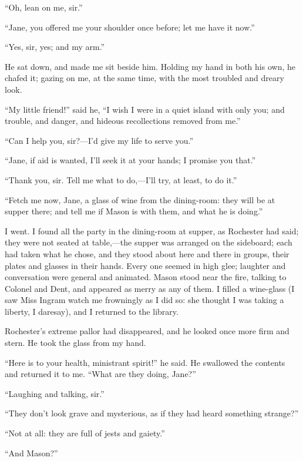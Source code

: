 \enquote{Oh, lean on me, sir.}

\enquote{Jane, you offered me your shoulder once before; let me have it
now.}

\enquote{Yes, sir, yes; and my arm.}

He sat down, and made me sit beside him. Holding my hand in both his
own, he chafed it; gazing on me, at the same time, with the most
troubled and dreary look.

\enquote{My little friend!} said he, \enquote{I wish I were in a quiet
island with only you; and trouble, and danger, and hideous recollections
removed from me.}

\enquote{Can I help you, sir?---I'd give my life to serve you.}

\enquote{Jane, if aid is wanted, I'll seek it at your hands; I promise
you that.}

\enquote{Thank you, sir. Tell me what to do,---I'll try, at least, to
do it.}

\enquote{Fetch me now, Jane, a glass of wine from the dining-room: they
will be at supper there; and tell me if Mason is with them, and what he
is doing.}

I went. I found all the party in the dining-room at supper, as \Mr{}
 Rochester had said; they were not seated at table,---the supper was
arranged on the sideboard; each had taken what he chose, and they stood
about here and there in groups, their plates and glasses in their
hands. Every one seemed in high glee; laughter and conversation were
general and animated. \Mr{} Mason stood near the fire, talking to Colonel
and \Mrs{} Dent, and appeared as merry as any of them. I filled a
wine-glass (I saw Miss Ingram watch me frowningly as I did so: she
thought I was taking a liberty, I daresay), and I returned to the
library.

\Mr{} Rochester's extreme pallor had disappeared, and he looked once more
firm and stern. He took the glass from my hand.

\enquote{Here is to your health, ministrant spirit!} he said. He
swallowed the contents and returned it to me. \enquote{What are they
doing, Jane?}

\enquote{Laughing and talking, sir.}

\enquote{They don't look grave and mysterious, as if they had heard
something strange?}

\enquote{Not at all: they are full of jests and gaiety.}

\enquote{And Mason?}

